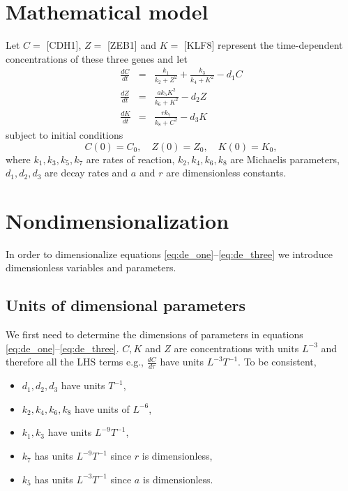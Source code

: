 \documentclass[10pt,letterpaper]{article}
\begin{document}
\section{Mathematical model}

Let $C=$ [CDH1], $Z=$ [ZEB1] and $K=$ [KLF8] represent the time-dependent concentrations of these three genes and let
\begin{eqnarray}
\frac{dC}{dt} &=& \frac{k_1}{k_2 + Z^2} + \frac{k_3}{k_4 + K^2} - d_1 C  \label{eq:de_one} \\
\frac{dZ}{dt} &=& \frac{a k_5 K^2}{k_6 + K^2} - d_2 Z \label{eq:de_two} \\
\frac{dK}{dt} &=& \frac{r k_7}{k_8 + C^2} - d_3 K \label{eq:de_three}
\end{eqnarray}
subject to initial conditions
\begin{equation}
\label{eq:de_ics}
C(0) = C_0, \quad Z(0) = Z_0, \quad K(0) = K_0,
\end{equation}
where $k_1, k_3, k_5, k_7$ are rates of reaction, $k_2, k_4, k_6, k_8$ are Michaelis parameters, $d_1, d_2, d_3$ are decay rates and $a$ and $r$ are dimensionless constants.


\section{Nondimensionalization}

In order to dimensionalize equations \eqref{eq:de_one}--\eqref{eq:de_three} we introduce dimensionless variables and parameters.

\subsection{Units of dimensional parameters}

We first need to determine the dimensions of parameters in equations \eqref{eq:de_one}--\eqref{eq:de_three}. $C, K$ and $Z$ are concentrations with units $L^{-3}$ and therefore all the LHS terms e.g., $\frac{dC}{d\tau}$ have units $L^{-3} T^{-1}$. To be consistent,

\begin{itemize}
  \item $d_1, d_2, d_3$ have units $T^{-1}$,
  \item $k_2, k_4, k_6, k_8$ have units of $L^{-6}$, %
  \item $k_1, k_3$ have units $L^{-9} T^{-1}$,
  \item $k_7$ has units $L^{-9} T^{-1}$ since $r$ is dimensionless,
  \item $k_5$ has units $L^{-3}T^{-1}$  since $a$ is dimensionless.
\end{itemize}
\end{document}
